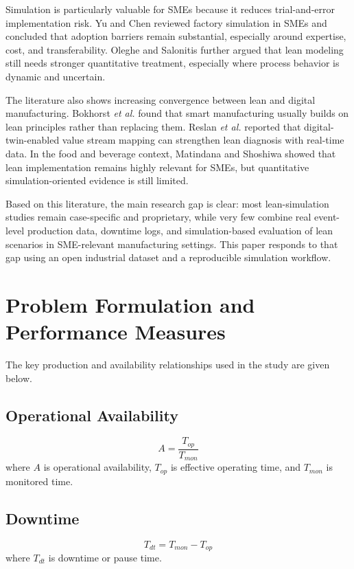 \documentclass[journal]{IEEEtran}
\begin{document}
Simulation is particularly valuable for SMEs because it reduces trial-and-error implementation risk. Yu and Chen \cite{yu2021sme} reviewed factory simulation in SMEs and concluded that adoption barriers remain substantial, especially around expertise, cost, and transferability. Oleghe and Salonitis \cite{oleghe2019hybrid} further argued that lean modeling still needs stronger quantitative treatment, especially where process behavior is dynamic and uncertain.

The literature also shows increasing convergence between lean and digital manufacturing. Bokhorst \emph{et al.} \cite{bokhorst2022smart} found that smart manufacturing usually builds on lean principles rather than replacing them. Reslan \emph{et al.} \cite{reslan2025digital} reported that digital-twin-enabled value stream mapping can strengthen lean diagnosis with real-time data. In the food and beverage context, Matindana and Shoshiwa \cite{matindana2025tanzania} showed that lean implementation remains highly relevant for SMEs, but quantitative simulation-oriented evidence is still limited.

Based on this literature, the main research gap is clear: most lean-simulation studies remain case-specific and proprietary, while very few combine real event-level production data, downtime logs, and simulation-based evaluation of lean scenarios in SME-relevant manufacturing settings. This paper responds to that gap using an open industrial dataset and a reproducible simulation workflow.

\section{Problem Formulation and Performance Measures}
The key production and availability relationships used in the study are given below.

\subsection{Operational Availability}
\begin{equation}
A = \frac{T_{op}}{T_{mon}}
\end{equation}
where $A$ is operational availability, $T_{op}$ is effective operating time, and $T_{mon}$ is monitored time.

\subsection{Downtime}
\begin{equation}
T_{dt} = T_{mon} - T_{op}
\end{equation}
where $T_{dt}$ is downtime or pause time.
\end{document}
